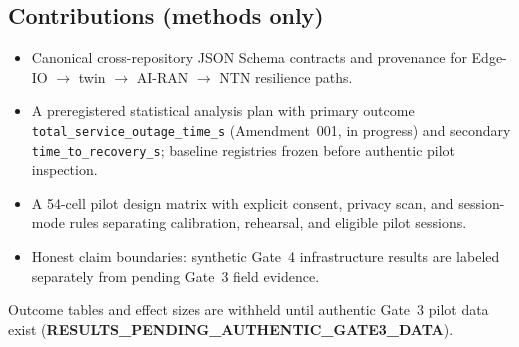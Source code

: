 \subsection{Contributions (methods only)}
\begin{itemize}
  \item Canonical cross-repository JSON Schema contracts and provenance for Edge-IO $\rightarrow$ twin $\rightarrow$ AI-RAN $\rightarrow$ NTN resilience paths.
  \item A preregistered statistical analysis plan with primary outcome \texttt{total\_service\_outage\_time\_s} (Amendment~001, in progress) and secondary \texttt{time\_to\_recovery\_s}; baseline registries frozen before authentic pilot inspection.
  \item A 54-cell pilot design matrix with explicit consent, privacy scan, and session-mode rules separating calibration, rehearsal, and eligible pilot sessions.
  \item Honest claim boundaries: synthetic Gate~4 infrastructure results are labeled separately from pending Gate~3 field evidence.
\end{itemize}

Outcome tables and effect sizes are withheld until authentic Gate~3 pilot data exist (\textbf{RESULTS\_PENDING\_AUTHENTIC\_GATE3\_DATA}).

